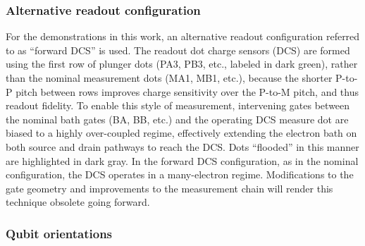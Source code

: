 \documentclass[aps,prl,twocolumn,superscriptaddress,nobibnotes,10pt,floatfix]{revtex4-2}
\begin{document}
\subsubsection{Alternative readout configuration}\label{alternative-readout-configuration}

For the demonstrations in this work, an alternative readout configuration referred to as ``forward DCS'' is used.
The readout dot charge sensors (DCS) are formed using the first row of plunger dots (PA3, PB3, etc., labeled in dark green), rather than the nominal measurement dots (MA1, MB1, etc.), because the shorter P-to-P pitch between rows improves charge sensitivity over the P-to-M pitch, and thus readout fidelity.
To enable this style of measurement, intervening gates between the nominal bath gates (BA, BB, etc.) and the operating DCS measure dot are biased to a highly over-coupled regime, effectively extending the electron bath on both source and drain pathways to reach the DCS.
Dots ``flooded'' in this manner are highlighted in dark gray.
In the forward DCS configuration, as in the nominal configuration, the DCS operates in a many-electron regime.
Modifications to the gate geometry and improvements to the measurement chain will render this technique obsolete going forward.

\subsubsection{Qubit orientations}\label{qubit-orientations}
\end{document}

